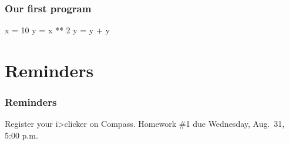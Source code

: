 \documentclass[11pt]{beamer}
\begin{document}
\begin{frame}[fragile]
  \frametitle{Our first program}
  \Enlarge

  \begin{semiverbatim}
x = 10
y = x ** 2
y = y + y
  \end{semiverbatim}
\end{frame}

\section{Reminders}

\begin{frame}
  \frametitle{Reminders}
  \Enlarge

  \begin{itemize}
  \myitem  Register your i>clicker on Compass.
  \myitem  Homework \#1 due Wednesday, Aug.\ 31, 5:00 p.m.
  \end{itemize}
\end{frame}
\end{document}

